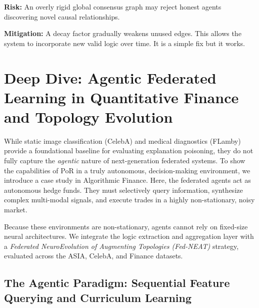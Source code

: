\documentclass[journal]{IEEEtran}
\begin{document}
\textbf{Risk:} An overly rigid global consensus graph may reject honest agents discovering novel causal relationships.

\textbf{Mitigation:} A decay factor gradually weakens unused edges. This allows the system to incorporate new valid logic over time. It is a simple fix but it works.

\newpage



\section{Deep Dive: Agentic Federated Learning in Quantitative Finance and Topology Evolution}
\label{sec:finance}

While static image classification (CelebA) and medical diagnostics (FLamby) provide a foundational baseline for evaluating explanation poisoning, they do not fully capture the \emph{agentic} nature of next-generation federated systems. To show the capabilities of PoR in a truly autonomous, decision-making environment, we introduce a case study in Algorithmic Finance. Here, the federated agents act as autonomous hedge funds. They must selectively query information, synthesize complex multi-modal signals, and execute trades in a highly non-stationary, noisy market.

Because these environments are non-stationary, agents cannot rely on fixed-size neural architectures. We integrate the logic extraction and aggregation layer with a \emph{Federated NeuroEvolution of Augmenting Topologies (Fed-NEAT)} strategy, evaluated across the ASIA, CelebA, and Finance datasets.

\subsection{The Agentic Paradigm: Sequential Feature Querying and Curriculum Learning}
\end{document}
